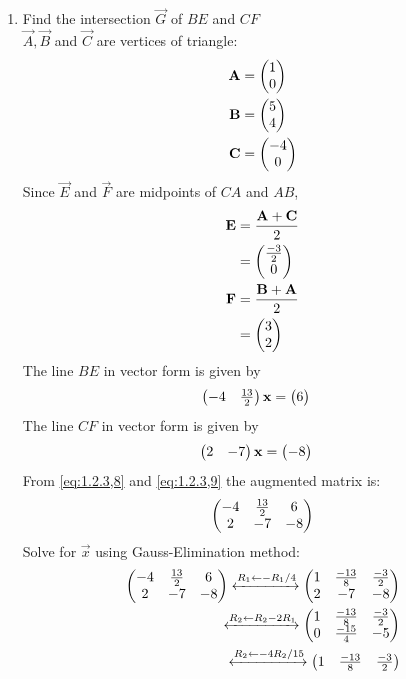 \documentclass[11pt]{book}
\begin{document}
\begin{enumerate}[label=\thesection.\arabic*.,ref=\thesection.\theenumi]
\item Find the intersection $\vec{G}$ of $BE$ and $CF$
\\ 
\solution 
$\vec{A},\vec{B}$ and $\vec{C}$ are vertices of triangle:
\begin{align}
    \mathbf{A} &= \begin{pmatrix}1 \\0\end{pmatrix} \\
    \mathbf{B} &= \begin{pmatrix}5 \\ 4\end{pmatrix} \\
    \mathbf{C} &= \begin{pmatrix}-4 \\0\end{pmatrix}
\end{align}
Since $\vec{E}$ and $\vec{F}$ are midpoints of $CA$ and $AB$,
\begin{align}
    \mathbf{E} &= \frac{\mathbf{A} + \mathbf{C}}{2} \\
	&= \begin{pmatrix}\frac{-3}{2} \\0\end{pmatrix}\\
    \mathbf{F} &= \frac{\mathbf{B} + \mathbf{A}}{2} \\ 
    &= \begin{pmatrix} 3 \\ 2\end{pmatrix}
\end{align}
The line $BE$ in vector form is given by
\begin{align}
\myvec{-4 & \frac{13}{2}} \vec{x} &= \myvec{6}
\label{eq:1.2.3,8}
\end{align}
The line $CF$ in vector form is given by
\begin{align}
\myvec{ 2&-7} \vec{x} &= \myvec{-8}
\label{eq:1.2.3,9}
\end{align}
From \eqref{eq:1.2.3,8} and \eqref{eq:1.2.3,9} the augmented matrix is:
\begin{align}
\begin{pmatrix}
-4 & \frac{13}{2} & {6} \\
2 & -7 & -8
\end{pmatrix}
\end{align}
Solve for $\vec{x}$ using Gauss-Elimination method:
\begin{align}
    \label{eq:matrowoperations}
 \myvec{
-4 & \frac{13}{2} & {6} \\
2 & -7 & -8
}
\xleftrightarrow[]{R_1 \leftarrow -R_1/4}
    \myvec{
    1 & \frac{-13}{8} & \frac{-3}{2}
    \\
    2 & -7 & -8 
    }
    \\
     \xleftrightarrow[]{R_2\leftarrow R_2-2R_1}
    \myvec{
    1 & \frac{-13}{8} & \frac{-3}{2}
    \\
    0 & \frac{-15}{4} & -5 
    }
    \\
     \xleftrightarrow[]{R_2\leftarrow -4R_2/15}
    \myvec{
    1 & \frac{-13}{8} & \frac{-3}{2}
    \\
}
\end{align}
\end{enumerate}
\end{document}
